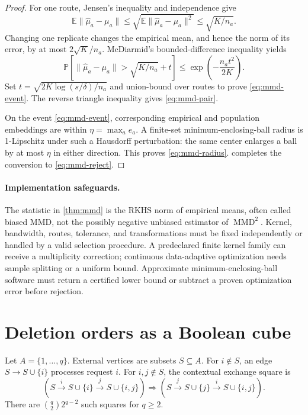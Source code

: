 \documentclass[10pt]{article}
\theoremstyle{definition}
\theoremstyle{remark}
\newcommand{\MMD}{\operatorname{MMD}}
\newcommand{\EE}{\mathbb{E}}
\newcommand{\PP}{\mathbb{P}}
\begin{document}
\begin{proof}
For one route, Jensen's inequality and independence give
\[
\EE\|\widehat\mu_a-\mu_a\|
\le
\sqrt{\EE\|\widehat\mu_a-\mu_a\|^2}
\le \sqrt{K/n_a}.
\]
Changing one replicate changes the empirical mean, and hence the norm of its
error, by at most \(2\sqrt K/n_a\). McDiarmid's bounded-difference inequality
\citep{mcdiarmid1989} yields
\[
\PP\left[
\|\widehat\mu_a-\mu_a\|>\sqrt{K/n_a}+t
\right]
\le
\exp\left(-\frac{n_at^2}{2K}\right).
\]
Set \(t=\sqrt{2K\log(s/\delta)/n_a}\) and union-bound over routes to prove
\eqref{eq:mmd-event}. The reverse triangle inequality gives
\eqref{eq:mmd-pair}.

On the event \eqref{eq:mmd-event}, corresponding empirical and population embeddings
are within \(\eta=\max_a e_a\). A finite-set minimum-enclosing-ball radius is
1-Lipschitz under such a Hausdorff perturbation: the same center enlarges a
ball by at most \(\eta\) in either direction. This proves
\eqref{eq:mmd-radius}.  completes the conversion to
\eqref{eq:mmd-reject}.
\end{proof}

\paragraph{Implementation safeguards.}
The statistic in \cref{thm:mmd} is the RKHS norm of empirical means, often
called biased MMD, not the possibly negative unbiased estimator of
\(\MMD^2\). Kernel, bandwidth, routes, tolerance, and transformations must be
fixed independently or handled by a valid selection procedure. A predeclared
finite kernel family can receive a multiplicity correction; continuous
data-adaptive optimization needs sample splitting or a uniform bound.
Approximate minimum-enclosing-ball software must return a certified lower
bound or subtract a proven optimization error before rejection.

\section{Deletion orders as a Boolean cube}

Let \(A=\{1,\ldots,q\}\). External vertices are subsets \(S\subseteq A\).
For \(i\notin S\), an edge \(S\to S\cup\{i\}\) processes request \(i\).
For \(i,j\notin S\), the contextual exchange square is
\[
\left(
S\xrightarrow{i}S\cup\{i\}\xrightarrow{j}S\cup\{i,j\}
\right)
\Rightarrow
\left(
S\xrightarrow{j}S\cup\{j\}\xrightarrow{i}S\cup\{i,j\}
\right).
\tag{6.1}
\]
There are \(\binom q2 2^{q-2}\) such squares for \(q\ge2\).
\end{document}
